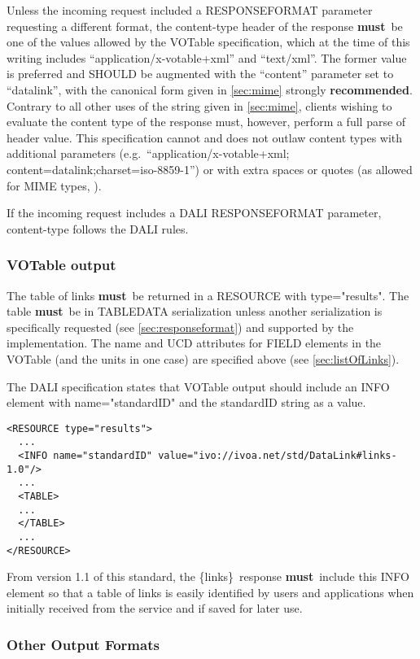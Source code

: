 \documentclass[11pt,a4paper]{ivoa}
\newcommand{\blinks}{\{links\}}
\newcommand{\attval}[2]{#1={\allowbreak}{"}#2{"}}
\newcommand{\rfcmust}{\textbf{must}}
\newcommand{\rfcrecommended}{\textbf{recommended}}
\begin{document}
Unless the incoming request included a RESPONSEFORMAT parameter requesting
a different format, the content-type header of the response \rfcmust\ be one of the 
values allowed by the VOTable specification, which at the time of this writing includes
``application/x-votable+xml'' and ``text/xml''. The former value is preferred
and SHOULD be augmented with the ``content'' parameter set to ``datalink'',
with the canonical form given in \ref{sec:mime}
strongly \rfcrecommended. Contrary to
all other uses of the string given in \ref{sec:mime},
clients wishing to evaluate
the content type of the response must, however, perform a full parse
of header value. This specification cannot and does not outlaw content
types with additional parameters
(e.g.\ ``application/x-votable+xml; content=datalink;charset=iso-8859-1'')
or with extra spaces or quotes
(as allowed for MIME types, \citet{std:RFC2045}).

If the incoming request includes a DALI RESPONSEFORMAT parameter,
content-type follows the DALI rules.


\subsubsection{VOTable output}

The table of links \rfcmust\ be returned in a RESOURCE with
\attval{type}{results}. The table \rfcmust\ be in TABLEDATA serialization
unless another serialization is specifically requested
(see \ref{sec:responseformat})
and supported by the implementation.
The name and UCD attributes for FIELD elements in the VOTable
(and the units in one case) are specified above (see \ref{sec:listOfLinks}).

The DALI specification states that VOTable output should include an
INFO element with \attval{name}{standardID} and the standardID string as a value.
\begin{verbatim}
<RESOURCE type="results">
  ... 
  <INFO name="standardID" value="ivo://ivoa.net/std/DataLink#links-1.0"/> 
  ... 
  <TABLE>
  ...
  </TABLE>
  ...
</RESOURCE>
\end{verbatim}
From version 1.1 of this standard, the \blinks\ response \rfcmust\ include this 
INFO element so that a table of links is easily identified by users and applications 
when initially received from the service and if saved for later use.

\subsubsection{Other Output Formats}
\end{document}
